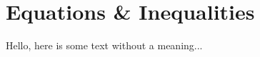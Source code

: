 \documentclass[../main.tex]{subfiles}
\begin{document}
\section{Equations \& Inequalities}

Hello, here is some text without a meaning...
\end{document}
